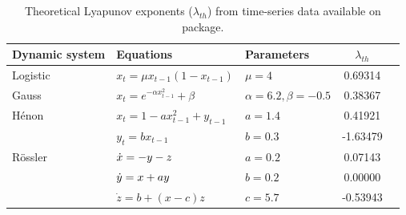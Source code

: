 \begin{table}[ht!]
\centering
\begin{adjustbox}{width=\textwidth}
\begin{tabular}{lllcc}
\hline 
Dynamic system & Equations                                                & Parameters      & ${\lambda _{th}}$ \\ \hline
Logistic         & ${x_t} = \mu{x_{t - 1}}\left( {1 - {x_{t - 1}}} \right)$ & $\mu  = 4$ & 0.69314 \\ \hline
Gauss         & ${x_t} = {e^{ - \alpha x_{t - 1}^2}} + \beta$ & $\alpha  = 6.2, \beta = -0.5$ & 0.38367 \\ \hline
H\'enon          & ${x_t} = 1 - ax_{t - 1}^2 + {y_{t - 1}}$                 & $a=1.4$ & 0.41921 \\
                 & ${y_t} = b{x_{t - 1}}$                                   & $b=0.3$ &-1.63479 \\ \hline
R\"ossler        & $\dot x =  - y - z \hfill$                               & $a=0.2$ & 0.07143 \\
                 & $\dot y = x + ay \hfill$                                 & $b=0.2$ & 0.00000 \\
                 & $\dot z = b + \left( {x - c} \right)z$                   & $c=5.7$ & -0.53943 \\ \hline
\end{tabular}
\end{adjustbox}
\caption{\label{tab:3} Theoretical Lyapunov exponents (${\lambda _{th}}$) from time-series data available on  package.}
\end{table}

